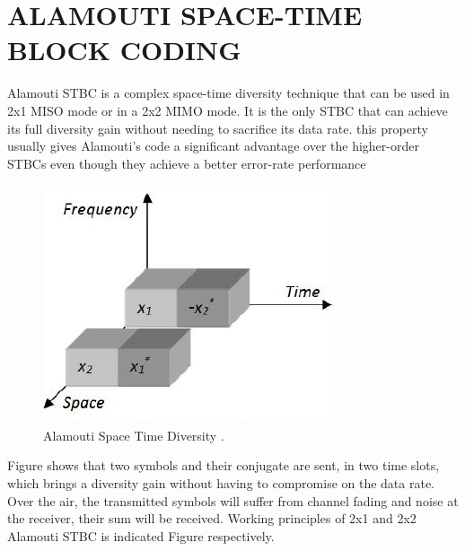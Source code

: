 \documentclass[12pt]{report}
\begin{document}
    \section*{ ALAMOUTI SPACE-TIME BLOCK CODING}
    Alamouti STBC is a complex space-time diversity
technique that can be used in 2x1 MISO mode or in a 2x2
MIMO mode. It is the only STBC that can achieve its full
diversity gain without needing to sacrifice its data rate.
this property usually gives Alamouti's code a significant
advantage over the higher-order STBCs even though they
achieve a better error-rate performance

\begin{figure}[!hbt]
		\begin{center}
		\includegraphics[width=\columnwidth]{A}
		\caption{ Alamouti Space Time Diversity .}
		\label{fig:tf_plot}
		\end{center}
	\end{figure}
Figure shows that two symbols and their conjugate are
sent, in two time slots, which brings a diversity gain
without having to compromise on the data rate. Over the
air, the transmitted symbols will suffer from channel
fading and noise at the receiver, their sum will be
received. Working principles of 2x1 and 2x2 Alamouti
STBC is indicated Figure respectively.
\end{document}
